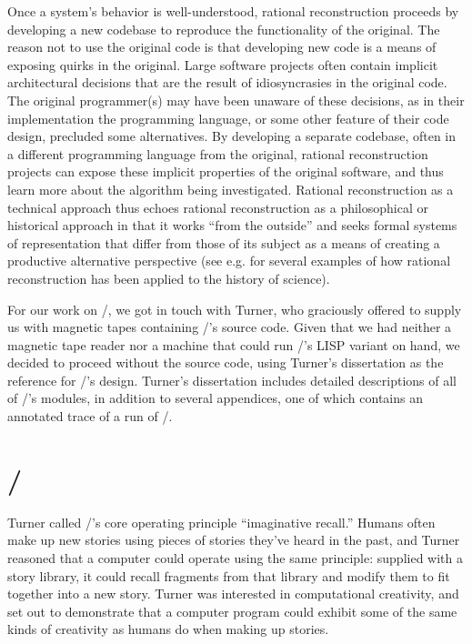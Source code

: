 Once a system's behavior is well-understood, rational reconstruction proceeds by developing a new codebase to reproduce the functionality of the original.
%
The reason not to use the original code is that developing new code is a means of exposing quirks in the original.
%
Large software projects often contain implicit architectural decisions that are the result of idiosyncrasies in the original code.
%
The original programmer(s) may have been unaware of these decisions, as in their implementation the programming language, or some other feature of their code design, precluded some alternatives.
%
By developing a separate codebase, often in a different programming language from the original, rational reconstruction projects can expose these implicit properties of the original software, and thus learn more about the algorithm being investigated.
%
Rational reconstruction as a technical approach thus echoes rational reconstruction as a philosophical or historical approach in that it works ``from the outside'' and seeks formal systems of representation that differ from those of its subject as a means of creating a productive alternative perspective (see e.g. \citep{Lakatos1971} for several examples of how rational reconstruction has been applied to the history of science).


For our work on \skald/, we got in touch with Turner, who graciously offered to supply us with magnetic tapes containing \minstrel/'s source code.
%
Given that we had neither a magnetic tape reader nor a machine that could run \minstrel/'s LISP variant on hand, we decided to proceed without the source code, using Turner's dissertation as the reference for \minstrel/'s design.
%
Turner's dissertation includes detailed descriptions of all of \minstrel/'s
modules, in addition to several appendices, one of which contains an annotated
trace of a run of \minstrel/.



\section{\skald/}


Turner called \minstrel/'s core operating principle ``imaginative recall.''
%
Humans often make up new stories using pieces of stories they've heard in the past, and Turner reasoned that a computer could operate using the same principle: supplied with a story library, it could recall fragments from that library and modify them to fit together into a new story.
%
Turner was interested in computational creativity, and set out to demonstrate that a computer program could exhibit some of the same kinds of creativity as humans do when making up stories.


